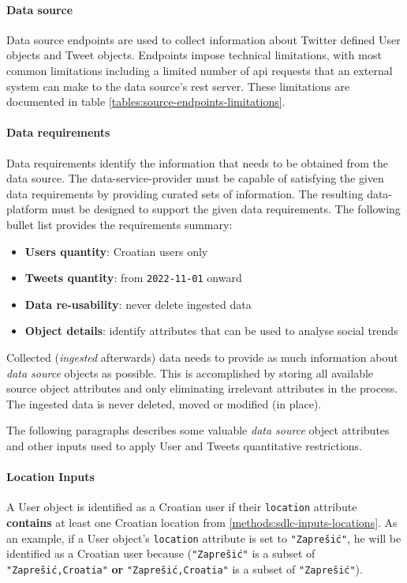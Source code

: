 \paragraph{Data source} Data source endpoints are used to collect information about Twitter defined User objects and Tweet objects. Endpoints impose technical limitations, with most common limitations including a limited number of \acrshort{api} requests that an external system can make to the data source's \acrshort{rest} server. These limitations are documented in table \ref{tables:source-endpoints-limitations}.



\paragraph{Data requirements} Data requirements identify the information that needs to be obtained from the data source. The \gls{data-service-provider} must be capable of satisfying the given data requirements by providing curated sets of information. The resulting \gls{data-platform} must be designed to support the given data requirements. The following bullet list provides the requirements summary:

\begin{itemize}
    \item \textbf{Users quantity}: Croatian users only
    \item \textbf{Tweets quantity}: from \texttt{2022-11-01} onward
    \item \textbf{Data re-usability}: never delete ingested data
    \item \textbf{Object details}: identify attributes that can be used to analyse social trends
\end{itemize}

Collected (\textit{ingested} afterwards) data needs to provide as much information about \textit{data source} objects as possible. This is accomplished by storing all available source object attributes and only eliminating irrelevant attributes in the  process. The ingested data is never deleted, moved or modified (in place).

The following paragraphs describes some valuable \textit{data source} object attributes and other inputs used to apply User and Tweets quantitative restrictions.

\paragraph{Location Inputs} A User object is identified as a Croatian user if their \texttt{location} attribute \textbf{contains} at least one Croatian location from \ref{methods:sdlc-inputs-locations}. As an example, if a User object's \texttt{location} attribute is set to \texttt{"Zaprešić"}, he will be identified as a Croatian user because (\texttt{"Zaprešić"} is a subset of \texttt{"Zaprešić,Croatia"} \textbf{or} \texttt{"Zaprešić,Croatia"} is a subset of \texttt{"Zaprešić"}). 


